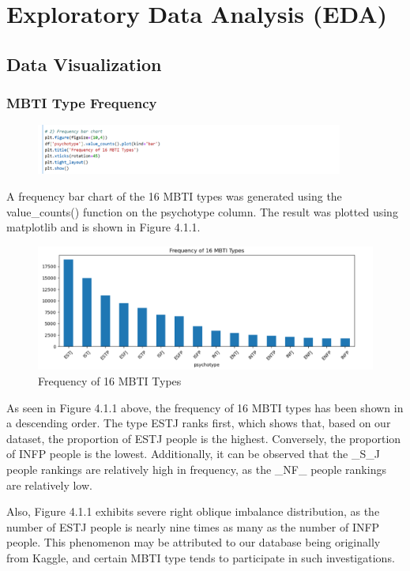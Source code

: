 \documentclass[12pt]{article}
\begin{document}
	\section{Exploratory Data Analysis (EDA)}
	\subsection{Data Visualization}
	\subsubsection{MBTI Type Frequency}
	\begin{figure}[H]
		\centering
		\includegraphics[width=0.9\textwidth]{Q1P3EDA1}
		
	\end{figure}
	
	A frequency bar chart of the 16 MBTI types was generated using the value\_counts() function on the psychotype column. The result was plotted using matplotlib and is shown in Figure 4.1.1.
	\begin{figure}[H]
		\centering
		\includegraphics{Q1EDA2} 
		\caption{Frequency of 16 MBTI Types}		
	\end{figure}
	
	As seen in Figure 4.1.1 above, the frequency of 16 MBTI types has been shown in a descending order. The type ESTJ ranks first, which shows that, based on our dataset, the proportion of ESTJ people is the highest. Conversely, the proportion of INFP people is the lowest. Additionally, it can be observed that the \_S\_J people rankings are relatively high in frequency, as the \_NF\_ people rankings are relatively low.
	
	Also, Figure 4.1.1 exhibits severe right oblique imbalance distribution, as the number of ESTJ people is nearly nine times as many as the number of INFP people. This phenomenon may be attributed to our database being originally from Kaggle, and certain MBTI type tends to participate in such investigations.
	
\end{document}
